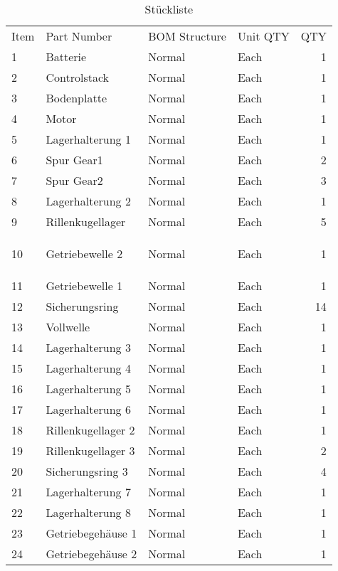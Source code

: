 \documentclass[11pt, a4paper]{scrartcl}
\begin{document}
\begin{table}[htbp]
    \centering
    \caption{Stückliste}
      \begin{tabular}{|l|l|l|l|r|}
      Item  & Part Number & BOM Structure & Unit QTY & \multicolumn{1}{l|}{QTY} \\
      1     & Batterie & Normal & Each  & 1 \\
      2     & Controlstack & Normal & Each  & 1 \\
      3     & Bodenplatte & Normal & Each  & 1 \\
      4     & Motor & Normal & Each  & 1 \\
      5     & Lagerhalterung 1 & Normal & Each  & 1 \\
      6     & Spur Gear1 & Normal & Each  & 2 \\
      7     & Spur Gear2 & Normal & Each  & 3 \\
      8     & Lagerhalterung 2 & Normal & Each  & 1 \\
      9     & Rillenkugellager & Normal & Each  & 5 \\
      10    & \hypertarget{Welle1}{Getriebewelle 2} & Normal & Each  & 1 \\
      11    & Getriebewelle 1 & Normal & Each  & 1 \\
      12    & Sicherungsring & Normal & Each  & 14 \\
      13    & Vollwelle & Normal & Each  & 1 \\
      14    & Lagerhalterung 3 & Normal & Each  & 1 \\
      15    & Lagerhalterung 4 & Normal & Each  & 1 \\
      16    & Lagerhalterung 5 & Normal & Each  & 1 \\
      17    & Lagerhalterung 6 & Normal & Each  & 1 \\
      18    & Rillenkugellager 2 & Normal & Each  & 1 \\
      19    & Rillenkugellager 3 & Normal & Each  & 2 \\
      20    & Sicherungsring 3 & Normal & Each  & 4 \\
      21    & Lagerhalterung 7 & Normal & Each  & 1 \\
      22    & Lagerhalterung 8 & Normal & Each  & 1 \\
      23    & Getriebegehäuse 1 & Normal & Each  & 1 \\
      24    & Getriebegehäuse 2 & Normal & Each  & 1 \\

\end{tabular}
\end{table}
\end{document}
